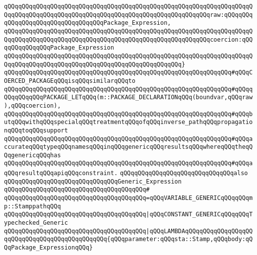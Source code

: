 \verb|qQQqqQQqqQQqqQQqqQQqqQQqqQQqqQQqqQQqqQQqqQQqqQQqqQQqqQQqqQQqqQQqqQQqqQQqqQQqqQQqqQQqqQQqqQQqqQQqqQQqqQQqqQQqqQQqqQQqqQQqqQQqqQQqraw:qQQqqQQqqQQqqQQqqQQqqQQqqQQqqQQqqQQqPackage_Expression,|\newline
\verb|qQQqqQQqqQQqqQQqqQQqqQQqqQQqqQQqqQQqqQQqqQQqqQQqqQQqqQQqqQQqqQQqqQQqqQQqqQQqqQQqqQQqqQQqqQQqqQQqqQQqqQQqqQQqqQQqqQQqqQQqqQQqqQQqcoercion:qQQqqQQqqQQqqQQqPackage_Expression|\newline
\verb|qQQqqQQqqQQqqQQqqQQqqQQqqQQqqQQqqQQqqQQqqQQqqQQqqQQqqQQqqQQqqQQqqQQqqQQqqQQqqQQqqQQqqQQqqQQqqQQqqQQqqQQqqQQqqQQqqQQqqQQq}|\newline
\newline
\verb|qQQqqQQqqQQqqQQqqQQqqQQqqQQqqQQqqQQqqQQqqQQqqQQqqQQqqQQqqQQqqQQq#qQQqCOERCED_PACKAGEqQQqisqQQqsimilarqQQqto|\newline
\verb|qQQqqQQqqQQqqQQqqQQqqQQqqQQqqQQqqQQqqQQqqQQqqQQqqQQqqQQqqQQqqQQq#qQQqqQQqqQQqqQQqPACKAGE_LETqQQq(m::PACKAGE_DECLARATIONqQQq(boundvar,qQQqraw),qQQqcoercion),|\newline
\verb|qQQqqQQqqQQqqQQqqQQqqQQqqQQqqQQqqQQqqQQqqQQqqQQqqQQqqQQqqQQqqQQq#qQQqbutqQQqwithqQQqspecialqQQqtreatmentqQQqofqQQqinverse_pathqQQqpropagationqQQqtoqQQqsupport|\newline
\verb|qQQqqQQqqQQqqQQqqQQqqQQqqQQqqQQqqQQqqQQqqQQqqQQqqQQqqQQqqQQqqQQq#qQQqaccurateqQQqtypeqQQqnamesqQQqinqQQqgenericqQQqresultsqQQqwhereqQQqtheqQQqgenericqQQqhas|\newline
\verb|qQQqqQQqqQQqqQQqqQQqqQQqqQQqqQQqqQQqqQQqqQQqqQQqqQQqqQQqqQQqqQQq#qQQqaqQQqresultqQQqapiqQQqconstraint.|\newline
\newline
\newline
\newline
\verb|qQQqqQQqqQQqqQQqqQQqqQQqqQQqqQQqalso|\newline
\verb|qQQqqQQqqQQqqQQqqQQqqQQqqQQqqQQqGeneric_Expression|\newline
\verb|qQQqqQQqqQQqqQQqqQQqqQQqqQQqqQQqqQQqqQQq#|\newline
\verb|qQQqqQQqqQQqqQQqqQQqqQQqqQQqqQQqqQQqqQQq=qQQqVARIABLE_GENERICqQQqqQQqmp::StamppathqQQq|\newline
\verb|qQQqqQQqqQQqqQQqqQQqqQQqqQQqqQQqqQQqqQQq|\verb#|qQQqCONSTANT_GENERICqQQqqQQqTypechecked_Generic#\newline
\verb|qQQqqQQqqQQqqQQqqQQqqQQqqQQqqQQqqQQqqQQq|\verb#|qQQqLAMBDAqQQqqQQqqQQqqQQqqQQqqQQqqQQqqQQqqQQqqQQqqQQqqQQq{qQQqparameter:qQQqsta::Stamp,qQQqbody:qQQqPackage_ExpressionqQQq}#\newline
